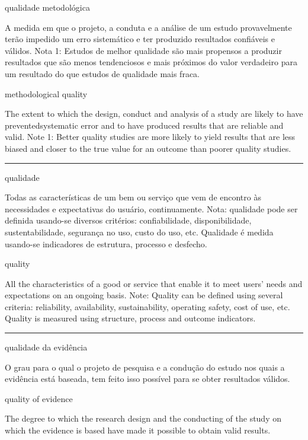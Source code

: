 \documentclass[
]{book}
\begin{document}
qualidade metodológica

A medida em que o projeto, a conduta e a análise de um estudo provavelmente terão impedido um erro sistemático e ter produzido resultados confiáveis e válidos. Nota 1: Estudos de melhor qualidade são mais propensos a produzir resultados que são menos tendenciosos e mais próximos do valor verdadeiro para um resultado do que estudos de qualidade mais fraca.

methodological quality

The extent to which the design, conduct and analysis of a study are likely to have preventedsystematic error and to have produced results that are reliable and valid. Note 1: Better quality studies are more likely to yield results that are less biased and closer to the true value for an outcome than poorer quality studies.

\begin{center}\rule{0.5\linewidth}{0.5pt}\end{center}

qualidade

Todas as características de um bem ou serviço que vem de encontro às necessidades e expectativas do usuário, continuamente. Nota: qualidade pode ser definida usando-se diversos critérios: confiabilidade, disponibilidade, sustentabilidade, segurança no uso, custo do uso, etc. Qualidade é medida usando-se indicadores de estrutura, processo e desfecho.

quality

All the characteristics of a good or service that enable it to meet users' needs and expectations on an ongoing basis. Note: Quality can be defined using several criteria: reliability, availability, sustainability, operating safety, cost of use, etc. Quality is measured using structure, process and outcome indicators.

\begin{center}\rule{0.5\linewidth}{0.5pt}\end{center}

qualidade da evidência

O grau para o qual o projeto de pesquisa e a condução do estudo nos quais a evidência está baseada, tem feito isso possível para se obter resultados válidos.

quality of evidence

The degree to which the research design and the conducting of the study on which the evidence is based have made it possible to obtain valid results.
\end{document}
